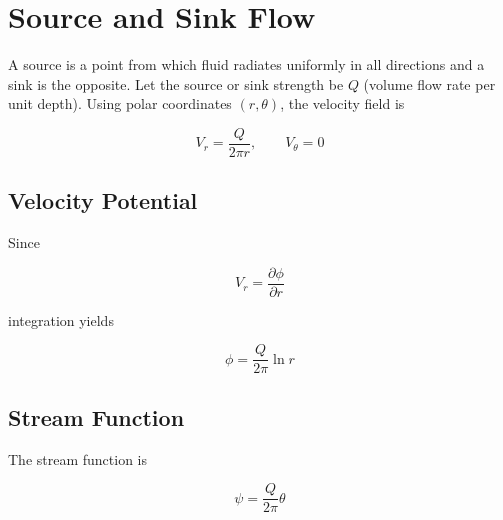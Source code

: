 \section{Source and Sink Flow}
\label{sec:source-flow}

A source is a point from which fluid radiates uniformly in all directions
and a sink is the opposite.
Let the source or sink strength be $Q$ (volume flow rate per unit depth).
Using polar coordinates $(r,\theta)$, the velocity field is

\[
V_r = \frac{Q}{2\pi r},
\qquad
V_\theta = 0
\]

\subsection{Velocity Potential}
\label{subsec:source-and-sink-flow-velocity-potential}

Since

\[
V_r = \frac{\partial \phi}{\partial r}
\]

integration yields

\[
\boxed{
\phi = \frac{Q}{2\pi}\ln r
}
\]

\subsection{Stream Function}
\label{subsec:source-and-sink-flow-stream-function}

The stream function is

\[
\boxed{
\psi
=
\frac{Q}{2\pi}\theta
}
\]
